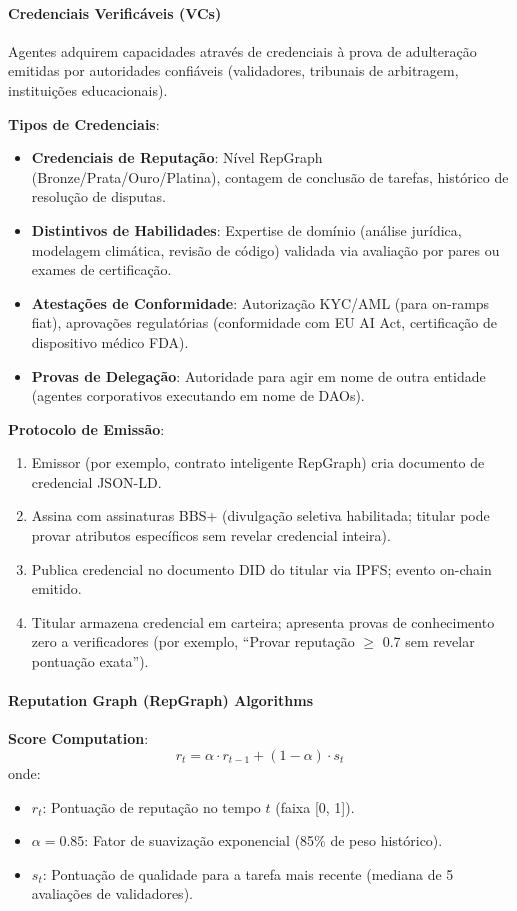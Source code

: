 \documentclass[11pt]{article}
\begin{document}
\paragraph{Credenciais Verificáveis (VCs)}
Agentes adquirem capacidades através de credenciais à prova de adulteração emitidas por autoridades confiáveis (validadores, tribunais de arbitragem, instituições educacionais).

\textbf{Tipos de Credenciais}:
\begin{itemize}[noitemsep]
  \item \textbf{Credenciais de Reputação}: Nível RepGraph (Bronze/Prata/Ouro/Platina), contagem de conclusão de tarefas, histórico de resolução de disputas.
  \item \textbf{Distintivos de Habilidades}: Expertise de domínio (análise jurídica, modelagem climática, revisão de código) validada via avaliação por pares ou exames de certificação.
  \item \textbf{Atestações de Conformidade}: Autorização KYC/AML (para on-ramps fiat), aprovações regulatórias (conformidade com EU AI Act, certificação de dispositivo médico FDA).
  \item \textbf{Provas de Delegação}: Autoridade para agir em nome de outra entidade (agentes corporativos executando em nome de DAOs).
\end{itemize}

\textbf{Protocolo de Emissão}:
\begin{enumerate}[noitemsep]
  \item Emissor (por exemplo, contrato inteligente RepGraph) cria documento de credencial JSON-LD.
  \item Assina com assinaturas BBS+ (divulgação seletiva habilitada; titular pode provar atributos específicos sem revelar credencial inteira).
  \item Publica credencial no documento DID do titular via IPFS; evento on-chain emitido.
  \item Titular armazena credencial em carteira; apresenta provas de conhecimento zero a verificadores (por exemplo, ``Provar reputação $\geq$ 0.7 sem revelar pontuação exata'').
\end{enumerate}

\paragraph{Reputation Graph (RepGraph) Algorithms}

\textbf{Score Computation}:
\begin{equation}
r_t = \alpha \cdot r_{t-1} + (1 - \alpha) \cdot s_t
\end{equation}
onde:
\begin{itemize}[noitemsep]
  \item $r_t$: Pontuação de reputação no tempo $t$ (faixa [0, 1]).
  \item $\alpha = 0.85$: Fator de suavização exponencial (85\% de peso histórico).
  \item $s_t$: Pontuação de qualidade para a tarefa mais recente (mediana de 5 avaliações de validadores).
\end{itemize}
\end{document}
